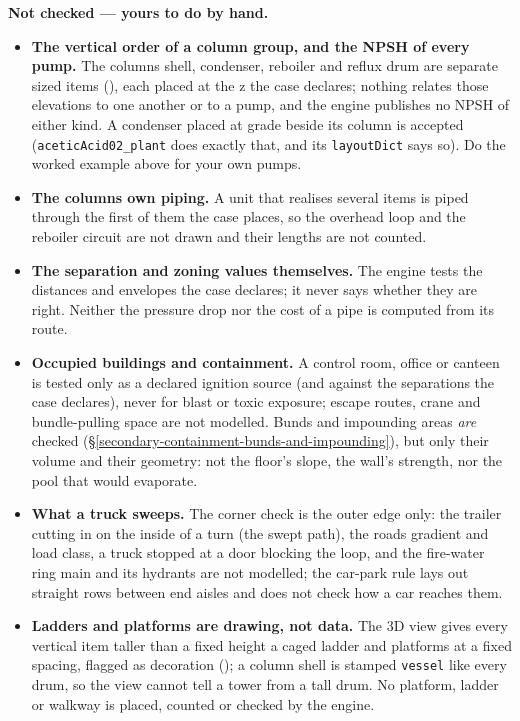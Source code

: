 \documentclass[11pt,a4paper]{article}
\providecommand{\tightlist}{\setlength{\itemsep}{0pt}\setlength{\parskip}{0pt}}
\begin{document}
\textbf{Not checked --- yours to do by hand.}
\begin{itemize}
\tightlist
\item
  \textbf{The vertical order of a column group, and the NPSH of every
  pump.} The column\textquotesingle s shell, condenser, reboiler and
  reflux drum are separate sized items
  (), each placed at the z
  the case declares; nothing relates those elevations to one another or
  to a pump, and the engine publishes no NPSH of either kind. A condenser
  placed at grade beside its column is accepted
  (\texttt{aceticAcid02\_plant} does exactly that, and its
  \texttt{layoutDict} says so). Do the worked example above for your own
  pumps.
\item
  \textbf{The column\textquotesingle s own piping.} A unit that realises
  several items is piped through the first of them the case places, so
  the overhead loop and the reboiler circuit are not drawn and their
  lengths are not counted.
\item
  \textbf{The separation and zoning values themselves.} The engine tests
  the distances and envelopes the case declares; it never says whether
  they are right. Neither the pressure drop nor the cost of a pipe is
  computed from its route.
\item
  \textbf{Occupied buildings and containment.} A control room, office or
  canteen is tested only as a declared ignition source (and against the
  separations the case declares), never for blast or toxic exposure;
  escape routes, crane and bundle-pulling space are not modelled.
  Bunds and impounding areas \emph{are} checked
  (\S\ref{secondary-containment-bunds-and-impounding}), but only their
  volume and their geometry: not the floor's slope, the wall's strength,
  nor the pool that would evaporate.
\item
  \textbf{What a truck sweeps.} The corner check is the outer edge only:
  the trailer cutting in on the inside of a turn (the swept path), the
  road\textquotesingle s gradient and load class, a truck stopped at a door
  blocking the loop, and the fire-water ring main and its hydrants are not
  modelled; the car-park rule lays out straight rows between end aisles
  and does not check how a car reaches them.
\item
  \textbf{Ladders and platforms are drawing, not data.} The 3D view gives
  every vertical item taller than a fixed height a caged ladder and
  platforms at a fixed spacing, flagged as decoration
  (); a column shell is stamped
  \texttt{vessel} like every drum, so the view cannot tell a tower from a
  tall drum. No platform, ladder or walkway is placed, counted or checked
  by the engine.
\end{itemize}
\end{document}
